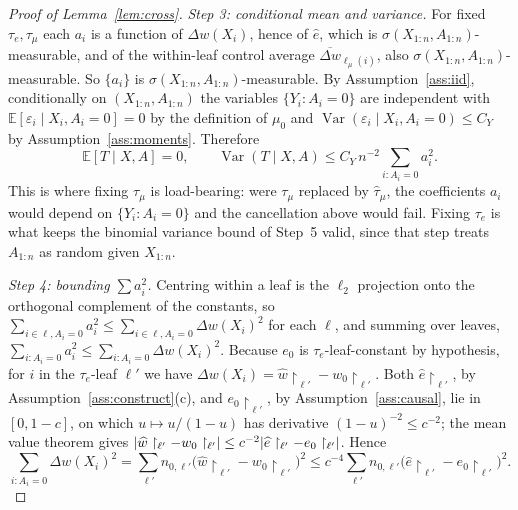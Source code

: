 \documentclass[11pt]{article}
\theoremstyle{plain}
\theoremstyle{definition}
\theoremstyle{remark}
\newcommand{\E}{\mathbb{E}}
\newcommand{\ez}{e_0}
\newcommand{\mz}{\mu_0}
\newcommand{\wz}{w_0}
\newcommand{\ehat}{\widehat{e}}
\newcommand{\what}{\widehat{w}}
\newcommand{\that}{\widehat{\tau}}
\DeclareMathOperator{\Var}{Var}
\DeclarePairedDelimiter{\abs}{\lvert}{\rvert}
\begin{document}
\begin{proof}[Proof of Lemma~\ref{lem:cross}]
\emph{Step 3: conditional mean and variance.} For fixed $\tau_e,\tau_\mu$ each
$a_i$ is a function of $\Delta w(X_i)$, hence of $\ehat$, which is
$\sigma(X_{1:n},A_{1:n})$-measurable, and of the within-leaf control average
$\overline{\Delta w}_{\ell_\mu(i)}$, also $\sigma(X_{1:n},A_{1:n})$-measurable.
So $\{a_i\}$ is $\sigma(X_{1:n},A_{1:n})$-measurable. By
Assumption~\ref{ass:iid}, conditionally on $(X_{1:n},A_{1:n})$ the variables
$\{Y_i:A_i=0\}$ are independent with $\E[\varepsilon_i\mid X_i,A_i=0]=0$ by the
definition of $\mz$ and $\Var(\varepsilon_i\mid X_i,A_i=0)\le C_Y$ by
Assumption~\ref{ass:moments}. Therefore
\[
  \E[T\mid X,A]=0,\qquad
  \Var(T\mid X,A)\le C_Y\,n^{-2}\sum_{i:A_i=0}a_i^2 .
\]
This is where fixing $\tau_\mu$ is load-bearing: were $\tau_\mu$ replaced by
$\that_\mu$, the coefficients $a_i$ would depend on $\{Y_i:A_i=0\}$ and the
cancellation above would fail. Fixing $\tau_e$ is what keeps the binomial
variance bound of Step~5 valid, since that step treats $A_{1:n}$ as random given
$X_{1:n}$.

\emph{Step 4: bounding $\sum a_i^2$.} Centring within a leaf is the $\ell_2$
projection onto the orthogonal complement of the constants, so
$\sum_{i\in\ell,A_i=0}a_i^2\le\sum_{i\in\ell,A_i=0}\Delta w(X_i)^2$ for each
$\ell$, and summing over leaves,
$\sum_{i:A_i=0}a_i^2\le\sum_{i:A_i=0}\Delta w(X_i)^2$. Because $\ez$ is
$\tau_e$-leaf-constant by hypothesis, for $i$ in the $\tau_e$-leaf $\ell'$ we
have
$\Delta w(X_i)=\what\restriction_{\ell'}-\wz\restriction_{\ell'}$. Both
$\ehat\restriction_{\ell'}$, by Assumption~\ref{ass:construct}(c), and
$\ez\restriction_{\ell'}$, by Assumption~\ref{ass:causal}, lie in $[0,1-c]$, on
which $u\mapsto u/(1-u)$ has derivative $(1-u)^{-2}\le c^{-2}$; the mean value
theorem gives
$\abs{\what\restriction_{\ell'}-\wz\restriction_{\ell'}}
\le c^{-2}\abs{\ehat\restriction_{\ell'}-\ez\restriction_{\ell'}}$. Hence
\[
  \sum_{i:A_i=0}\Delta w(X_i)^2
  =\sum_{\ell'}n_{0,\ell'}
   \bigl(\what\restriction_{\ell'}-\wz\restriction_{\ell'}\bigr)^2
  \le c^{-4}\sum_{\ell'}n_{0,\ell'}
   \bigl(\ehat\restriction_{\ell'}-\ez\restriction_{\ell'}\bigr)^2 .
\]


\end{proof}
\end{document}
